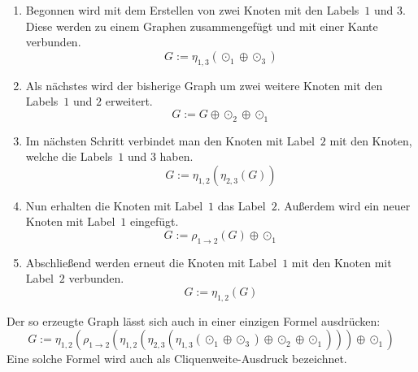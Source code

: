 \begin{enumerate}
    \item[\subref{pic:bsp_CliqueWidthGem_a}] Begonnen wird mit dem Erstellen von zwei Knoten mit den Labels~$1$ und $3$. Diese werden zu einem Graphen zusammengefügt und mit einer Kante verbunden.
    \[ G:= \eta_{1,3}(\odot_1 \oplus \odot_3) \]
    
    \item[\subref{pic:bsp_CliqueWidthGem_b}] Als nächstes wird der bisherige Graph um zwei weitere Knoten mit den Labels~$1$ und $2$ erweitert.
    \[ G:= G \oplus \odot_2 \oplus \odot_1 \]
    
    \item[\subref{pic:bsp_CliqueWidthGem_c}] Im nächsten Schritt verbindet man den Knoten mit Label~$2$ mit den Knoten, welche die Labels~$1$ und $3$ haben.
    \[ G:= \eta_{1,2}(\eta_{2,3}(G)) \]
    
    \item[\subref{pic:bsp_CliqueWidthGem_d}] Nun erhalten die Knoten mit Label~$1$ das Label~$2$. Außerdem wird ein neuer Knoten mit Label~$1$ eingefügt.
    \[ G:= \rho_{1 \rightarrow 2}(G) \oplus \odot_1 \]
    
    \item[\subref{pic:bsp_CliqueWidthGem_e}] Abschließend werden erneut die Knoten mit Label~$1$ mit den Knoten mit Label~$2$ verbunden.
    \[ G:= \eta_{1,2}(G) \]
    

\end{enumerate}

Der so erzeugte Graph lässt sich auch in einer einzigen Formel ausdrücken:
\[ G:=\eta_{1,2}(\rho_{1 \rightarrow 2}(\eta_{1,2}(\eta_{2,3}(\eta_{1,3}(\odot_1 \oplus \odot_3) \oplus \odot_2 \oplus \odot_1))) \oplus \odot_1)  \]
Eine solche Formel wird auch als Cliquenweite-Ausdruck bezeichnet.


